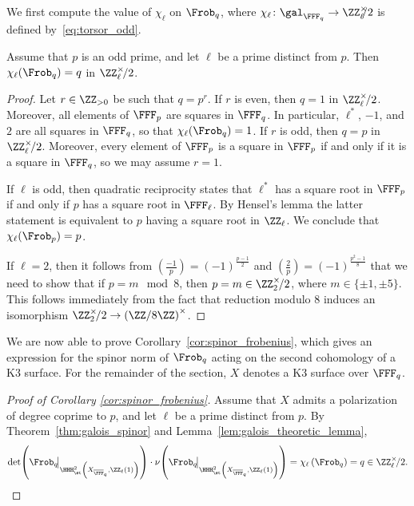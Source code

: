 We first compute the value of $\chi_{\ell}$ on $\Frob_{q}$, where $\chi_{\ell}\colon \gal_{\FFF_q} \rightarrow \ZZ^{\times}_{\ell}\hspace{-5pt}/2$ is defined by~\eqref{eq:torsor_odd}.
\begin{lemma}\label{lem:galois_theoretic_lemma}
Assume that $p$ is an odd prime, and let $\ell$ be a prime distinct from $p$. Then $\chi_{\ell}(\Frob_q) = q$ in $\ZZ_{\ell}^{\times}\!/2$.
\end{lemma}
\begin{proof}
Let $r \in \ZZ_{> 0}$ be such that $q = p^r$. If $r$ is even, then $q = 1$ in $\ZZ_{\ell}^{\times}\!/2$. Moreover, all elements of $\FFF_p$ are squares in $\FFF_{q}$. In particular, $\ell^*$, $-1$, and $2$ are all squares in $\FFF_q$, so that $\chi_{\ell}(\Frob_q) = 1$. If $r$ is odd, then $q = p$ in $\ZZ_{\ell}^{\times}\!/2$. Moreover, every element of $\FFF_p$ is a square in $\FFF_p$ if and only if it is a square in $\FFF_q$, so we may assume $r = 1$.

If $\ell$ is odd, then quadratic reciprocity states that $\ell^*$ has a square root in $\FFF_p$ if and only if $p$ has a square root in $\FFF_{\ell}$. By Hensel's lemma the latter statement is equivalent to $p$ having a square root in $\ZZ_{\ell}$. We conclude that $\chi_{\ell}(\Frob_p) = p$.

If $\ell = 2$, then it follows from $\left(\tfrac{-1}{p}\right) = (-1)^{\tfrac{p - 1}{2}}$ and $\left(\tfrac{2}{p}\right) = (-1)^{\tfrac{p^2 - 1}{8}}$ that we need to show that if $p = m \mod 8$, then $p = m \in \ZZ_2^{\times}\!/2$, where $m \in \{\pm 1, \pm 5\}$. This follows immediately from the fact that reduction modulo $8$ induces an isomorphism $\ZZ_2^{\times}\!/2 \rightarrow \left(\ZZ/8\ZZ\right)^{\times}$.
\end{proof}

We are now able to prove Corollary~\ref{cor:spinor_frobenius}, which gives an expression for the spinor norm of $\Frob_q$ acting on the second cohomology of a K3 surface. For the remainder of the section, $X$ denotes a K3 surface over $\FFF_q$.
\begin{proof}[Proof of Corollary \ref{cor:spinor_frobenius}]
    Assume that $X$ admits a polarization of degree coprime to $p$, and let $\ell$ be a prime distinct from $p$. By Theorem~\ref{thm:galois_spinor} and Lemma~\ref{lem:galois_theoretic_lemma},
$$
    \det\!\left(\Frob_q\!\big|_{\HHH^2_{\et}\left(X_{\overline{\FFF}_q},\ZZ_{\ell}(1)\right)}\right) \cdot \nu\!\left(\Frob_q\!\big|_{\HHH^2_{\et}\left(X_{\overline{\FFF}_q},\ZZ_{\ell}(1)\right)}\right) = \chi_{\ell}\left(\Frob_q\right) = q \in \ZZ_{\ell}^\times\!/2.
$$
\end{proof}


